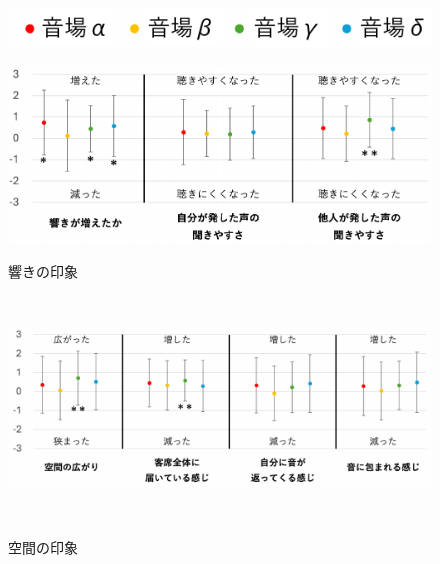 \documentclass[11pt,a4j]{jreport}
\begin{document}
\newpage
\begin{figure}[H]
  \centering
  
  \begin{minipage}{1\linewidth}
    \centering
    \includegraphics[scale=.55]{images/subjectiveExp/statisticAnalysis/legend.pdf}
    \label{fig:段階評価の凡例}
  \end{minipage}

  \vspace{1\baselineskip}

  \begin{minipage}{1\linewidth}
    \centering
    \includegraphics[scale=.55]{images/subjectiveExp/statisticAnalysis/01reverb_a.pdf}
    \caption*{響きの印象}
    \label{fig:響きの印象}
  \end{minipage}
  \\
  \vspace{1\baselineskip}
  \begin{minipage}{1\linewidth}
    \centering
    \includegraphics[scale=.55]{images/subjectiveExp/statisticAnalysis/02space_a.pdf}
    \caption*{空間の印象}
    \label{fig:空間の印象}
  \end{minipage}
  \\
  \vspace{1\baselineskip}

\end{figure}
\end{document}
